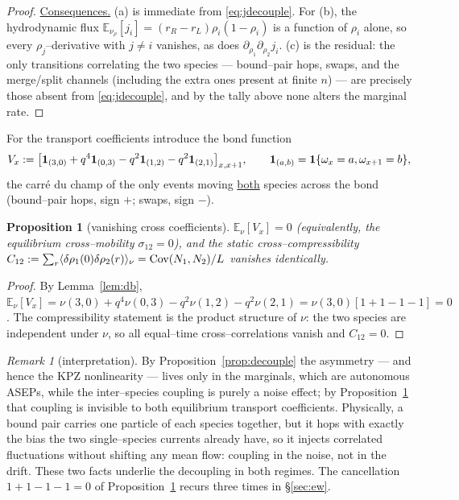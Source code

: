 \documentclass[11pt]{article}
\theoremstyle{plain}
\newtheorem{proposition}[theorem]{Proposition}
\theoremstyle{definition}
\theoremstyle{remark}
\newtheorem{remark}[theorem]{Remark}
\newcommand{\E}{\mathbb{E}}\newcommand{\PP}{\mathbb{P}}\newcommand{\dd}{\,\mathrm{d}}
\begin{document}
\begin{proof}
\underline{Consequences.} (a) is immediate from \eqref{eq:jdecouple}. For (b), the
hydrodynamic flux $\E_{\nu_\rho}[j_i]=(r_R-r_L)\rho_i(1-\rho_i)$ is a function of
$\rho_i$ alone, so every $\rho_j$--derivative with $j\ne i$ vanishes, as does
$\partial_{\rho_1}\partial_{\rho_2}j_i$. (c) is the residual: the only transitions
correlating the two species --- bound--pair hops, swaps, and the merge/split channels
(including the extra ones present at finite $n$) --- are precisely those absent from
\eqref{eq:jdecouple}, and by the tally above none alters the marginal rate.
\end{proof}

For the transport coefficients introduce the bond function
\begin{equation}\label{eq:Vdef}
  V_x:=\big[\mathbf 1_{(3,0)}+q^4\mathbf 1_{(0,3)}-q^2\mathbf 1_{(1,2)}-q^2\mathbf 1_{(2,1)}\big]_{x,x+1},
  \qquad \mathbf 1_{(a,b)}=\mathbf 1\{\omega_x=a,\omega_{x+1}=b\},
\end{equation}
the carr\'e du champ of the only events moving \underline{both} species across the bond
(bound--pair hops, sign $+$; swaps, sign $-$).

\begin{proposition}[vanishing cross coefficients]\label{prop:cross}
$\E_\nu[V_x]=0$ \textup{(}equivalently, the equilibrium cross--mobility
$\sigma_{12}=0$\textup{)}, and the static cross--compressibility
$C_{12}:=\sum_r\langle\delta\rho_1(0)\delta\rho_2(r)\rangle_\nu=\operatorname{Cov}(N_1,N_2)/L$
vanishes identically.
\end{proposition}
\begin{proof}
By Lemma~\ref{lem:db},
$\E_\nu[V_x]=\nu(3,0)+q^4\nu(0,3)-q^2\nu(1,2)-q^2\nu(2,1)=\nu(3,0)[1+1-1-1]=0$. The
compressibility statement is the product structure of $\nu$: the two species are
independent under $\nu$, so all equal--time cross--correlations vanish and $C_{12}=0$.
\end{proof}

\begin{remark}[interpretation]\label{rem:transport}
By Proposition~\ref{prop:decouple} the asymmetry --- and hence the KPZ nonlinearity ---
lives only in the marginals, which are autonomous ASEPs, while the inter--species
coupling is purely a noise effect; by Proposition~\ref{prop:cross} that coupling is
invisible to both equilibrium transport coefficients. Physically, a bound pair carries
one particle of each species together, but it hops with exactly the bias the two
single--species currents already have, so it injects correlated fluctuations without
shifting any mean flow: coupling in the noise, not in the drift. These two facts
underlie the decoupling in both regimes. The cancellation $1+1-1-1=0$ of
Proposition~\ref{prop:cross} recurs three times in \S\ref{sec:ew}.
\end{remark}
\end{document}
